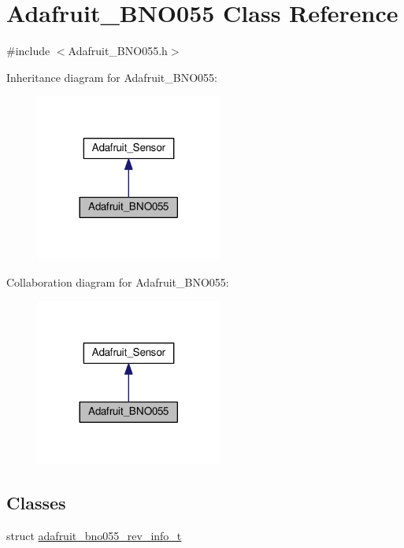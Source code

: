 \hypertarget{classAdafruit__BNO055}{}\section{Adafruit\+\_\+\+B\+N\+O055 Class Reference}
\label{classAdafruit__BNO055}


{\ttfamily \#include $<$Adafruit\+\_\+\+B\+N\+O055.\+h$>$}



Inheritance diagram for Adafruit\+\_\+\+B\+N\+O055\+:\nopagebreak
\begin{figure}[H]
\begin{center}
\leavevmode
\includegraphics[width=173pt]{classAdafruit__BNO055__inherit__graph}
\end{center}
\end{figure}


Collaboration diagram for Adafruit\+\_\+\+B\+N\+O055\+:\nopagebreak
\begin{figure}[H]
\begin{center}
\leavevmode
\includegraphics[width=173pt]{classAdafruit__BNO055__coll__graph}
\end{center}
\end{figure}
\subsection*{Classes}
\begin{DoxyCompactItemize}
\item 
struct \hyperlink{structAdafruit__BNO055_1_1adafruit__bno055__rev__info__t}{adafruit\+\_\+bno055\+\_\+rev\+\_\+info\+\_\+t}
\end{DoxyCompactItemize}
